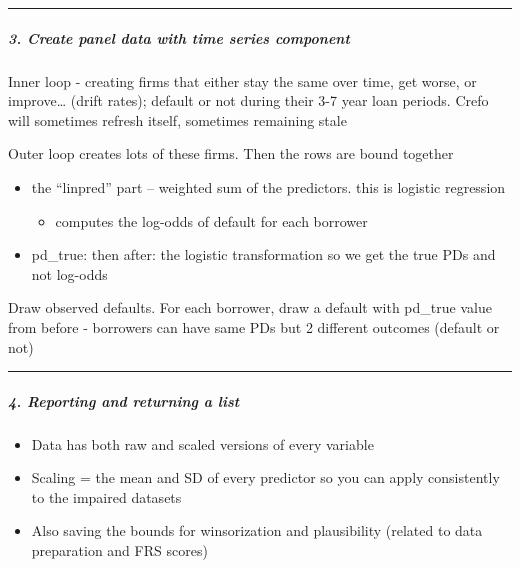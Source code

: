\documentclass[
]{article}
\providecommand{\tightlist}{%
  \setlength{\itemsep}{0pt}\setlength{\parskip}{0pt}}
\begin{document}
\begin{center}\rule{0.5\linewidth}{0.5pt}\end{center}

\subparagraph{\texorpdfstring{\textbf{3. Create panel data with time
series
component}}{3. Create panel data with time series component}}\label{create-panel-data-with-time-series-component}

Inner loop - creating firms that either stay the same over time, get
worse, or improve\ldots{} (drift rates); default or not during their 3-7
year loan periods. Crefo will sometimes refresh itself, sometimes
remaining stale

Outer loop creates lots of these firms. Then the rows are bound together

\begin{itemize}
\tightlist
\item
  the ``linpred'' part -- weighted sum of the predictors. this is
  logistic regression

  \begin{itemize}
  \tightlist
  \item
    computes the log-odds of default for each borrower
  \end{itemize}
\item
  pd\_true: then after: the logistic transformation so we get the true
  PDs and not log-odds
\end{itemize}

Draw observed defaults. For each borrower, draw a default with pd\_true
value from before - borrowers can have same PDs but 2 different outcomes
(default or not)

\begin{center}\rule{0.5\linewidth}{0.5pt}\end{center}

\subparagraph{\texorpdfstring{\textbf{4. Reporting and returning a list
}}{4. Reporting and returning a list }}\label{reporting-and-returning-a-list}

\begin{itemize}
\tightlist
\item
  Data has both raw and scaled versions of every variable
\item
  Scaling = the mean and SD of every predictor so you can apply
  consistently to the impaired datasets
\item
  Also saving the bounds for winsorization and plausibility (related to
  data preparation and FRS scores)
\end{itemize}
\end{document}
